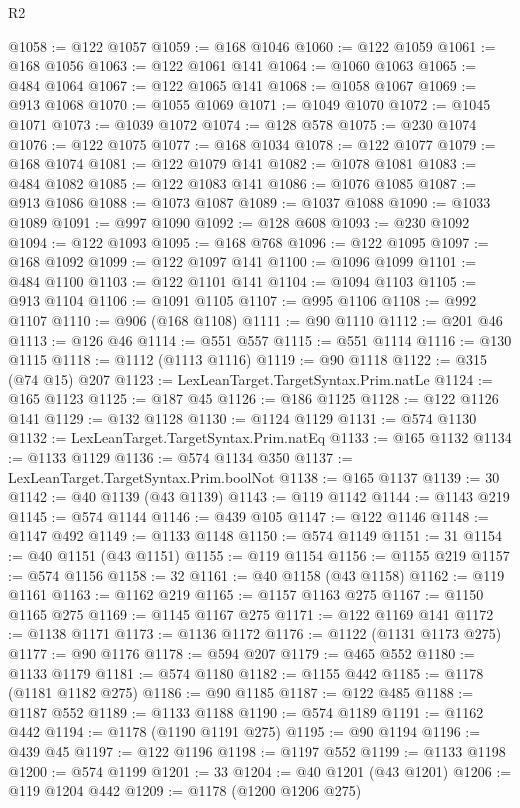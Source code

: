 \begin{lexlean}{R2}
\begin{coremodule}
{{{{{{{{{{{{{{{{{{{{{{{{{{{{{{{{{{{{{{{{{{{{{{{{{{{{{{{{{{{{{{{{{{{{{{{{{{{{{{{{{{{{{{{{{{{{@1058 := @122 @1057
@1059 := @168 @1046
@1060 := @122 @1059
@1061 := @168 @1056
@1063 := @122 @1061 @141
@1064 := @1060 @1063
@1065 := @484 @1064
@1067 := @122 @1065 @141
@1068 := @1058 @1067
@1069 := @913 @1068
@1070 := @1055 @1069
@1071 := @1049 @1070
@1072 := @1045 @1071
@1073 := @1039 @1072
@1074 := @128 @578
@1075 := @230 @1074
@1076 := @122 @1075
@1077 := @168 @1034
@1078 := @122 @1077
@1079 := @168 @1074
@1081 := @122 @1079 @141
@1082 := @1078 @1081
@1083 := @484 @1082
@1085 := @122 @1083 @141
@1086 := @1076 @1085
@1087 := @913 @1086
@1088 := @1073 @1087
@1089 := @1037 @1088
@1090 := @1033 @1089
@1091 := @997 @1090
@1092 := @128 @608
@1093 := @230 @1092
@1094 := @122 @1093
@1095 := @168 @768
@1096 := @122 @1095
@1097 := @168 @1092
@1099 := @122 @1097 @141
@1100 := @1096 @1099
@1101 := @484 @1100
@1103 := @122 @1101 @141
@1104 := @1094 @1103
@1105 := @913 @1104
@1106 := @1091 @1105
@1107 := @995 @1106
@1108 := @992 @1107
@1110 := @906 (@168 @1108)
@1111 := @90 @1110
@1112 := @201 @46
@1113 := @126 @46
@1114 := @551 @557
@1115 := @551 @1114
@1116 := @130 @1115
@1118 := @1112 (@1113 @1116)
@1119 := @90 @1118
@1122 := @315 (@74 @15) @207
@1123 := LexLeanTarget.TargetSyntax.Prim.natLe
@1124 := @165 @1123
@1125 := @187 @45
@1126 := @186 @1125
@1128 := @122 @1126 @141
@1129 := @132 @1128
@1130 := @1124 @1129
@1131 := @574 @1130
@1132 := LexLeanTarget.TargetSyntax.Prim.natEq
@1133 := @165 @1132
@1134 := @1133 @1129
@1136 := @574 @1134 @350
@1137 := LexLeanTarget.TargetSyntax.Prim.boolNot
@1138 := @165 @1137
@1139 := 30
@1142 := @40 @1139 (@43 @1139)
@1143 := @119 @1142
@1144 := @1143 @219
@1145 := @574 @1144
@1146 := @439 @105
@1147 := @122 @1146
@1148 := @1147 @492
@1149 := @1133 @1148
@1150 := @574 @1149
@1151 := 31
@1154 := @40 @1151 (@43 @1151)
@1155 := @119 @1154
@1156 := @1155 @219
@1157 := @574 @1156
@1158 := 32
@1161 := @40 @1158 (@43 @1158)
@1162 := @119 @1161
@1163 := @1162 @219
@1165 := @1157 @1163 @275
@1167 := @1150 @1165 @275
@1169 := @1145 @1167 @275
@1171 := @122 @1169 @141
@1172 := @1138 @1171
@1173 := @1136 @1172
@1176 := @1122 (@1131 @1173 @275)
@1177 := @90 @1176
@1178 := @594 @207
@1179 := @465 @552
@1180 := @1133 @1179
@1181 := @574 @1180
@1182 := @1155 @442
@1185 := @1178 (@1181 @1182 @275)
@1186 := @90 @1185
@1187 := @122 @485
@1188 := @1187 @552
@1189 := @1133 @1188
@1190 := @574 @1189
@1191 := @1162 @442
@1194 := @1178 (@1190 @1191 @275)
@1195 := @90 @1194
@1196 := @439 @45
@1197 := @122 @1196
@1198 := @1197 @552
@1199 := @1133 @1198
@1200 := @574 @1199
@1201 := 33
@1204 := @40 @1201 (@43 @1201)
@1206 := @119 @1204 @442
@1209 := @1178 (@1200 @1206 @275)
}}}}}}}}}}}}}}}}}}}}}}}}}}}}}}}}}}}}}}}}}}}}}}}}}}}}}}}}}}}}}}}}}}}}}}}}}}}}}}}}}}}}}}}}}}}}
\end{coremodule}
\end{lexlean}
